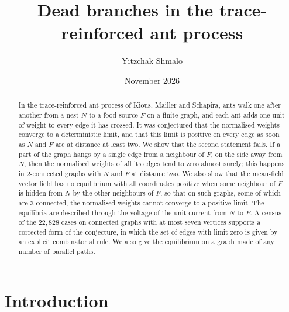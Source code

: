 \documentclass[11pt]{amsart}
\title{Dead branches in the trace-reinforced ant process}
\author{Yitzchak Shmalo}
\date{November 2026}
\theoremstyle{remark}
\begin{document}
\begin{abstract}
In the trace-reinforced ant process of Kious, Mailler and Schapira, ants walk one after another from a nest $N$ to a
food source $F$ on a finite graph, and each ant adds one unit of weight to every edge it has crossed. It was conjectured
that the normalised weights converge to a deterministic limit, and that this limit is positive on every edge as soon as
$N$ and $F$ are at distance at least two. We show that the second statement fails. If a part of the graph hangs by a
single edge from a neighbour of $F$, on the side away from $N$, then the normalised weights of all its edges tend to
zero almost surely; this happens in $2$-connected graphs with $N$ and $F$ at distance two. We also show that the
mean-field vector field has no equilibrium with all coordinates positive when some neighbour of $F$ is hidden from $N$
by the other neighbours of $F$, so that on such graphs, some of which are $3$-connected, the normalised weights cannot
converge to a positive limit. The equilibria are described through the voltage of the unit current from $N$ to $F$.
A census of the $22{,}828$ cases on connected graphs with at most seven vertices supports a corrected form of the
conjecture, in which the set of edges with limit zero is given by an explicit combinatorial rule. We also give the
equilibrium on a graph made of any number of parallel paths.
\end{abstract}
\maketitle

\section{Introduction}
\end{document}
